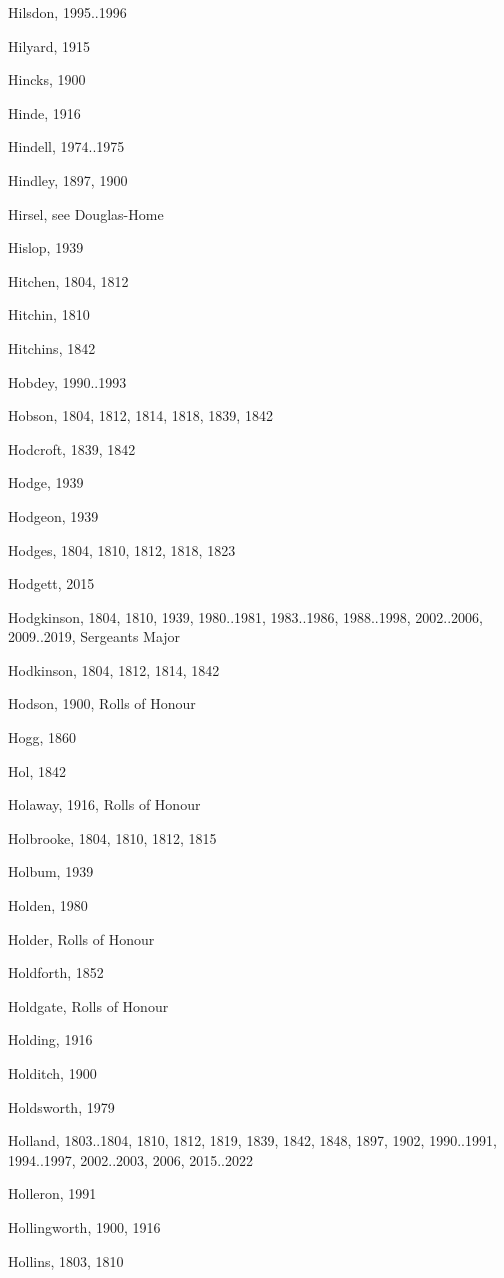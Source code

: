{\begin{theindex}
\item Hilsdon, 1995..1996
\item Hilyard, 1915
\item Hincks, 1900
\item Hinde, 1916
\item Hindell, 1974..1975
\item Hindley, 1897, 1900
\item Hirsel, see Douglas-Home
\item Hislop, 1939
\item Hitchen, 1804, 1812
\item Hitchin, 1810
\item Hitchins, 1842
\item Hobdey, 1990..1993
\item Hobson, 1804, 1812, 1814, 1818, 1839, 1842
\item Hodcroft, 1839, 1842
\item Hodge, 1939
\item Hodgeon, 1939
\item Hodges, 1804, 1810, 1812, 1818, 1823
\item Hodgett, 2015
\item Hodgkinson, 1804, 1810, 1939, 1980..1981, 1983..1986, 1988..1998, 2002..2006, 2009..2019, Sergeants Major
\item Hodkinson, 1804, 1812, 1814, 1842
\item Hodson, 1900, Rolls of Honour
\item Hogg, 1860
\item Hol, 1842
\item Holaway, 1916, Rolls of Honour
\item Holbrooke, 1804, 1810, 1812, 1815
\item Holbum, 1939
\item Holden, 1980
\item Holder, Rolls of Honour
\item Holdforth, 1852
\item Holdgate, Rolls of Honour
\item Holding, 1916
\item Holditch, 1900
\item Holdsworth, 1979
\item Holland, 1803..1804, 1810, 1812, 1819, 1839, 1842, 1848, 1897, 1902, 1990..1991, 1994..1997, 2002..2003, 2006, 2015..2022
\item Holleron, 1991
\item Hollingworth, 1900, 1916
\item Hollins, 1803, 1810

\end{theindex}}
